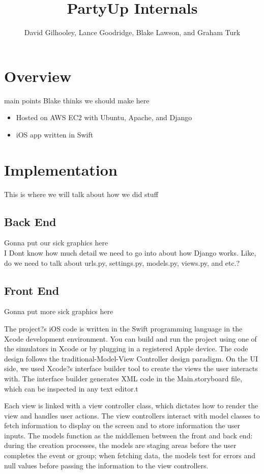 \documentclass[12pt]{article}
\title{PartyUp Internals}
\author{David Gilhooley, Lance Goodridge, Blake Lawson, and Graham Turk}
\begin{document}
\pagestyle{plain}

\maketitle

\section{Overview}

main points Blake thinks we should make here

\begin{itemize}
\item Hosted on AWS EC2 with Ubuntu, Apache, and Django
\item iOS app written in Swift
\end{itemize}

\section{Implementation}

This is where we will talk about how we did stuff

\subsection{Back End}

Gonna put our sick graphics here \\
I Dont know how much detail we need to go into about how
Django works. Like, do we need to talk about urls.py, settings.py,
models.py, views.py, and etc.?

\subsection{Front End}

Gonna put more sick graphics here

The project?s iOS code is written in the Swift programming language in the Xcode development environment. You can build and run the project using one of the simulators in Xcode or by plugging in a registered Apple device. The code design follows the traditional-Model-View Controller design paradigm. On the UI side, we used Xcode?s interface builder tool to create the views the user interacts with. The interface builder generates XML code in the Main.storyboard file, which can be inspected in any text editor.t

Each view is linked with a view controller class, which dictates how to render the view and handles user actions. The view controllers interact with model classes to fetch information to display on the screen and to store information the user inputs. The models function as the middlemen between the front and back end: during the creation processes, the models are staging areas before the user completes the event or group; when fetching data, the models test for errors and null values before passing the information to the view controllers.
\end{document}
